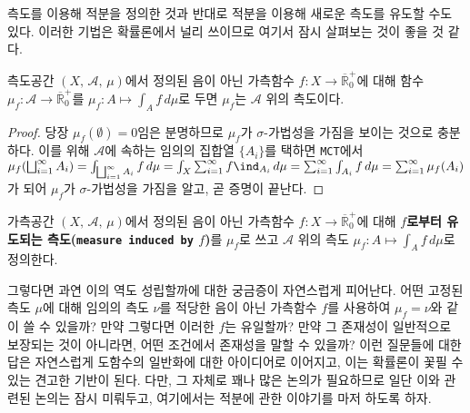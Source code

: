 측도를 이용해 적분을 정의한 것과 반대로 적분을 이용해 새로운 측도를 유도할 수도 있다. 이러한 기법은 확률론에서 널리 쓰이므로 여기서 잠시 살펴보는 것이 좋을 것 같다.

\begin{theorem}
    측도공간 $(X,\,\mathcal{A},\,\mu)$에서 정의된 음이 아닌 가측함수 $f:X\to\overline{\mathbb{R}}^+_0$에 대해 함수 $\mu_f:\mathcal{A}\to\overline{\mathbb{R}}^+_0$를 $\mu_f:A\mapsto\int_Af\,d\mu$로 두면 $\mu_f$는 $\mathcal{A}$ 위의 측도이다.
\end{theorem}

\begin{proof}
    당장 $\mu_f(\emptyset)=0$임은 분명하므로 $\mu_f$가 $\sigma$-가법성을 가짐을 보이는 것으로 충분하다. 이를 위해 $\mathcal{A}$에 속하는 임의의 집합열 $\{A_i\}$를 택하면 \texttt{MCT}에서 $\mu_f(\bigsqcup_{i=1}^\infty A_i)=\int_{\bigsqcup_{i=1}^\infty A_i}f\,d\mu=\int_X\sum_{i=1}^\infty f\ind_{A_i}\,d\mu=\sum_{i=1}^\infty\int_{A_i}f\,d\mu=\sum_{i=1}^\infty\mu_f(A_i)$가 되어 $\mu_f$가 $\sigma$-가법성을 가짐을 알고, 곧 증명이 끝난다.
\end{proof}

\begin{definition}
    가측공간 $(X,\,\mathcal{A},\,\mu)$에서 정의된 음이 아닌 가측함수 $f:X\to\overline{\mathbb{R}}^+_0$에 대해 \textbf{$f$로부터 유도되는 측도(\texttt{measure induced by} $f$)}를 $\mu_f$로 쓰고 $\mathcal{A}$ 위의 측도 $\mu_f:A\mapsto\int_Af\,d\mu$로 정의한다.
\end{definition}

그렇다면 과연 이의 역도 성립할까에 대한 궁금증이 자연스럽게 피어난다. 어떤 고정된 측도 $\mu$에 대해 임의의 측도 $\nu$를 적당한 음이 아닌 가측함수 $f$를 사용하여 $\mu_f=\nu$와 같이 쓸 수 있을까? 만약 그렇다면 이러한 $f$는 유일할까? 만약 그 존재성이 일반적으로 보장되는 것이 아니라면, 어떤 조건에서 존재성을 말할 수 있을까? 이런 질문들에 대한 답은 자연스럽게 도함수의 일반화에 대한 아이디어로 이어지고, 이는 확률론이 꽃필 수 있는 견고한 기반이 된다. 다만, 그 자체로 꽤나 많은 논의가 필요하므로 일단 이와 관련된 논의는 잠시 미뤄두고, 여기에서는 적분에 관한 이야기를 마저 하도록 하자.

